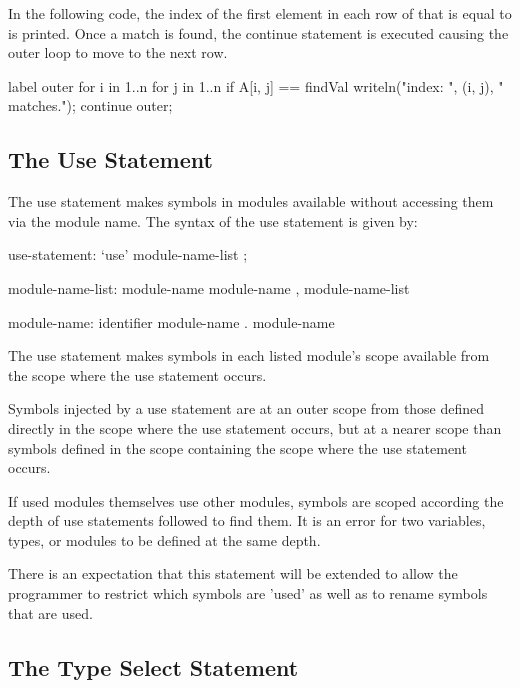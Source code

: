 \begin{example}
In the following code, the index of the first element in each row of
 that is equal to  is printed.  Once a match is
found, the continue statement is executed causing the outer loop to
move to the next row.
\begin{chapel}
label outer for i in 1..n {
  for j in 1..n {
    if A[i, j] == findVal {
      writeln("index: ", (i, j), " matches.");
      continue outer;
    }
  }
}
\end{chapel}
\end{example}

\subsection{The Use Statement}
\label{The_Use_Statement}

The use statement makes symbols in modules available without accessing
them via the module name.  The syntax of the use statement is given
by:
\begin{syntax}
use-statement:
  `use' module-name-list ;

module-name-list:
  module-name
  module-name , module-name-list

module-name:
  identifier
  module-name . module-name
\end{syntax}
The use statement makes symbols in each listed module's scope available
from the scope where the use statement occurs.

Symbols injected by a use statement are at an outer scope from those
defined directly in the scope where the use statement occurs, but at a
nearer scope than symbols defined in the scope containing the scope where
the use statement occurs.

If used modules themselves use other modules, symbols are scoped according
the depth of use statements followed to find them. It is an error for two
variables, types, or modules to be defined at the same depth.

\begin{openissue}
There is an expectation that this statement will be extended to allow
the programmer to restrict which symbols are 'used' as well as to
rename symbols that are used.
\end{openissue}

\subsection{The Type Select Statement}
\label{The_Type_Select_Statement}

